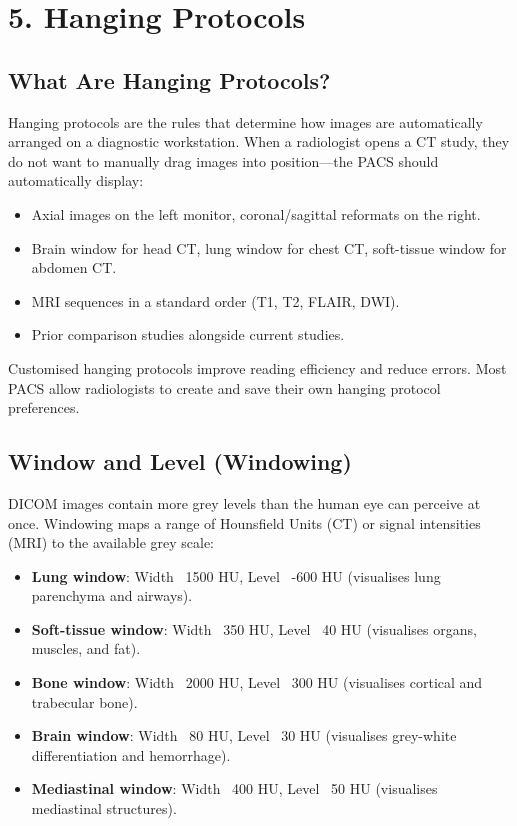 \section*{5. Hanging Protocols}

\subsection*{What Are Hanging Protocols?}
Hanging protocols are the rules that determine how images are automatically arranged on a diagnostic workstation. When a radiologist opens a CT study, they do not want to manually drag images into position---the PACS should automatically display:
\begin{itemize}
    \item Axial images on the left monitor, coronal/sagittal reformats on the right.
    \item Brain window for head CT, lung window for chest CT, soft-tissue window for abdomen CT.
    \item MRI sequences in a standard order (T1, T2, FLAIR, DWI).
    \item Prior comparison studies alongside current studies.
\end{itemize}

Customised hanging protocols improve reading efficiency and reduce errors. Most PACS allow radiologists to create and save their own hanging protocol preferences.

\subsection*{Window and Level (Windowing)}
DICOM images contain more grey levels than the human eye can perceive at once. Windowing maps a range of Hounsfield Units (CT) or signal intensities (MRI) to the available grey scale:
\begin{itemize}
    \item \textbf{Lung window}: Width ~1500 HU, Level ~-600 HU (visualises lung parenchyma and airways).
    \item \textbf{Soft-tissue window}: Width ~350 HU, Level ~40 HU (visualises organs, muscles, and fat).
    \item \textbf{Bone window}: Width ~2000 HU, Level ~300 HU (visualises cortical and trabecular bone).
    \item \textbf{Brain window}: Width ~80 HU, Level ~30 HU (visualises grey-white differentiation and hemorrhage).
    \item \textbf{Mediastinal window}: Width ~400 HU, Level ~50 HU (visualises mediastinal structures).
\end{itemize}


